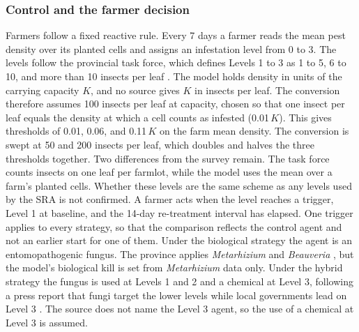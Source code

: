 \subsubsection{Control and the farmer decision}

Farmers follow a fixed reactive rule. Every 7 days a farmer reads the mean pest density over its planted cells and assigns an infestation level from 0 to 3. The levels follow the provincial task force, which defines Levels 1 to 3 as 1 to 5, 6 to 10, and more than 10 insects per leaf \citep{PGNO2026}. The model holds density in units of the carrying capacity $K$, and no source gives $K$ in insects per leaf. The conversion therefore assumes 100 insects per leaf at capacity, chosen so that one insect per leaf equals the density at which a cell counts as infested (0.01\,$K$). This gives thresholds of 0.01, 0.06, and 0.11\,$K$ on the farm mean density. The conversion is swept at 50 and 200 insects per leaf, which doubles and halves the three thresholds together. Two differences from the survey remain. The task force counts insects on one leaf per farmlot, while the model uses the mean over a farm's planted cells. Whether these levels are the same scheme as any levels used by the SRA is not confirmed. A farmer acts when the level reaches a trigger, Level 1 at baseline, and the 14-day re-treatment interval has elapsed. One trigger applies to every strategy, so that the comparison reflects the control agent and not an earlier start for one of them. Under the biological strategy the agent is an entomopathogenic fungus. The province applies \emph{Metarhizium} and \emph{Beauveria} \citep{PGNO2026}, but the model's biological kill is set from \emph{Metarhizium} data only. Under the hybrid strategy the fungus is used at Levels 1 and 2 and a chemical at Level 3, following a press report that fungi target the lower levels while local governments lead on Level 3 \citep{Gomez2026}. The source does not name the Level 3 agent, so the use of a chemical at Level 3 is assumed.

